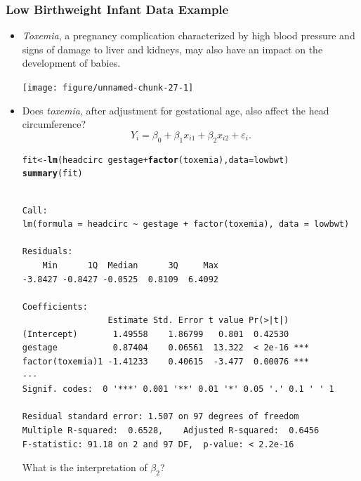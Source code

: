 \documentclass[oneside]{book}\usepackage[]{graphicx}\usepackage[svgnames]{xcolor}
\makeatletter
\newcommand{\hlopt}[1]{\textcolor[rgb]{0,0,0}{#1}}%
\newcommand{\hlstd}[1]{\textcolor[rgb]{0.345,0.345,0.345}{#1}}%
\newcommand{\hlkwb}[1]{\textcolor[rgb]{0.69,0.353,0.396}{#1}}%
\newcommand{\hlkwc}[1]{\textcolor[rgb]{0.333,0.667,0.333}{#1}}%
\newcommand{\hlkwd}[1]{\textcolor[rgb]{0.737,0.353,0.396}{\textbf{#1}}}%
\newenvironment{kframe}{%
 \def\at@end@of@kframe{}%
 \ifinner\ifhmode%
  \def\at@end@of@kframe{\end{minipage}}%
  \begin{minipage}{\columnwidth}%
 \fi\fi%
 \def\FrameCommand##1{\hskip\@totalleftmargin \hskip-\fboxsep
 \colorbox{shadecolor}{##1}\hskip-\fboxsep
     \hskip-\linewidth \hskip-\@totalleftmargin \hskip\columnwidth}%
 \MakeFramed {\advance\hsize-\width
   \@totalleftmargin\z@ \linewidth\hsize
   \@setminipage}}%
 {\par\unskip\endMakeFramed%
 \at@end@of@kframe}
\newenvironment{knitrout}{}{} %
\makeatother
\begin{document}
\subsubsection*{Low Birthweight Infant Data Example}
\begin{itemize}
      \item \emph{Toxemia}, a pregnancy complication characterized by high blood pressure
            and signs of damage to liver and kidneys, may also have an impact on the
            development of babies.
\begin{knitrout}
\color{fgcolor}

{\centering \texttt{[image: figure/unnamed-chunk-27-1]} 

}


\end{knitrout}
      \item Does \emph{toxemia}, after adjustment for gestational age, also affect the head
            circumference?
            \[ Y_i=\beta_0+\beta_1x_{i1}+\beta_2x_{i2}+\varepsilon_i. \]
\begin{knitrout}
\color{fgcolor}\begin{kframe}
\begin{alltt}
\hlstd{fit} \hlkwb{<-} \hlkwd{lm}\hlstd{(headcirc} \hlopt{~} \hlstd{gestage} \hlopt{+} \hlkwd{factor}\hlstd{(toxemia),} \hlkwc{data} \hlstd{= lowbwt)}
\hlkwd{summary}\hlstd{(fit)}
\end{alltt}
\begin{verbatim}

Call:
lm(formula = headcirc ~ gestage + factor(toxemia), data = lowbwt)

Residuals:
    Min      1Q  Median      3Q     Max 
-3.8427 -0.8427 -0.0525  0.8109  6.4092 

Coefficients:
                 Estimate Std. Error t value Pr(>|t|)    
(Intercept)       1.49558    1.86799   0.801  0.42530    
gestage           0.87404    0.06561  13.322  < 2e-16 ***
factor(toxemia)1 -1.41233    0.40615  -3.477  0.00076 ***
---
Signif. codes:  0 '***' 0.001 '**' 0.01 '*' 0.05 '.' 0.1 ' ' 1

Residual standard error: 1.507 on 97 degrees of freedom
Multiple R-squared:  0.6528,	Adjusted R-squared:  0.6456 
F-statistic: 91.18 on 2 and 97 DF,  p-value: < 2.2e-16
\end{verbatim}
\end{kframe}
\end{knitrout}
            What is the interpretation of $ \beta_2 $?


\end{itemize}
\end{document}
